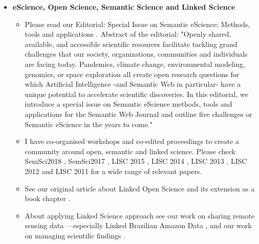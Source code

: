 \documentclass[11pt,letterpaper]{article}
\begin{document}
\begin{itemize}
\item \textbf{eScience, Open Science, Semantic Science and Linked Science}
\begin{itemize}
\item Please read our Editorial: Special Issue on Semantic eScience: Methods, tools and applications \cite{Semantic-eScience-SWJ-2020}. Abstract of the editorial: "Openly shared, available, and accessible scientific resources facilitate tackling grand challenges that our society, organizations, communities and individuals are facing today. Pandemics, climate change, environmental modeling, genomics, or space exploration all create open research questions for which Artificial Intelligence -and Semantic Web in particular- have a unique potential to accelerate scientific discoveries. In this editorial, we introduce a special issue on Semantic eScience methods, tools and applications for the Semantic Web Journal and outline five challenges or Semantic eScience in the years to come."
\item I have co-organised workshops and co-edited proceedings to create a community around open, semantic and linked science. Please check SemSci2018 \cite{semsci2018},
SemSci2017 \cite{semsci2017}, LISC 2015 \cite{lisc2015}, LISC 2014 \cite{lisc2014}, LISC 2013 \cite{lisc2013}, LISC 2012
\cite{lisc2012} and LISC 2011 \cite{lisc2011} for a wide range of relevant papers.
\item See our original article about Linked Open Science \cite{LinkedOpenScience2011} and its extension as a book chapter \cite{kauppinen-et-al-linked-science-2013}.
\item About applying Linked Science approach see our work on sharing remote sensing data
		\cite{kauppinen-remote-sensing-data-2012}---especially Linked Brazilian Amazon Data \cite{kauppinen-et-al-linked-brazilian-amazon-2014}, and our work on managing scientific findings \cite{baglatzi-kauppinen-ekaw2012-2012}.


\end{itemize}
\end{itemize}
\end{document}
